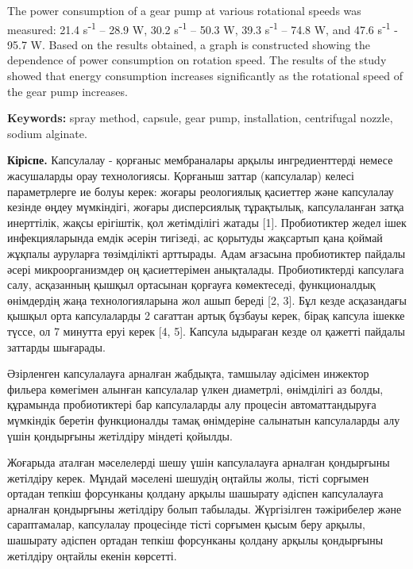 The power consumption of a gear pump at various rotational speeds was
measured: 21.4 s⁻\textsuperscript{1} -- 28.9 W, 30.2
s⁻\textsuperscript{1} -- 50.3 W, 39.3 s⁻\textsuperscript{1} -- 74.8 W,
and 47.6 s⁻\textsuperscript{1} - 95.7 W. Based on the results obtained,
a graph is constructed showing the dependence of power consumption on
rotation speed. The results of the study showed that energy consumption
increases significantly as the rotational speed of the gear pump
increases.

{\bfseries Keywords:} spray method, capsule, gear pump, installation,
centrifugal nozzle, sodium alginate.

\begin{multicols}{2}
{\bfseries Кіріспе.} Капсулалау - қорғаныс мембраналары арқылы
ингредиенттерді немесе жасушаларды орау технологиясы. Қорғаныш заттар
(капсулалар) келесі параметрлерге ие болуы керек: жоғары реологиялық
қасиеттер және капсулалау кезінде өңдеу мүмкіндігі, жоғары дисперсиялық
тұрақтылық, капсулаланған затқа инерттілік, жақсы ерігіштік, қол
жетімділігі жатады {[}1{]}. Пробиотиктер жедел ішек инфекцияларында
емдік әсерін тигізеді, ас қорытуды жақсартып қана қоймай жұқпалы
ауруларға төзімділікті арттырады. Адам ағзасына пробиотиктер пайдалы
әсері микроорганизмдер оң қасиеттерімен анықталады. Пробиотиктерді
капсулаға салу, асқазанның қышқыл ортасынан қорғауға көмектеседі,
функционалдық өнімдердің жаңа технологияларына жол ашып береді {[}2,
3{]}. Бұл кезде асқазандағы қышқыл орта капсулаларды 2 сағаттан артық
бұзбауы керек, бірақ капсула ішекке түссе, ол 7 минутта еруі керек {[}4,
5{]}. Капсула ыдыраған кезде ол қажетті пайдалы заттарды шығарады.

Әзірленген капсулалауға арналған жабдықта, тамшылау әдісімен инжектор
фильера көмегімен алынған капсулалар үлкен диаметрлі, өнімділігі аз
болды, құрамында пробиотиктері бар капсулаларды алу процесін
автоматтандыруға мүмкіндік беретін функционалды тамақ өнімдеріне
салынатын капсулаларды алу үшін қондырғыны жетілдіру міндеті қойылды.

Жоғарыда аталған мәселелерді шешу үшін капсулалауға арналған қондырғыны
жетілдіру керек. Мұндай мәселені шешудің оңтайлы жолы, тісті сорғымен
ортадан тепкіш форсунканы қолдану арқылы шашырату әдіспен капсулалауға
арналған қондырғыны жетілдіру болып табылады. Жүргізілген тәжірибелер
және сараптамалар, капсулалау процесінде тісті сорғымен қысым беру
арқылы, шашырату әдіспен ортадан тепкіш форсунканы қолдану арқылы
қондырғыны жетілдіру оңтайлы екенін көрсетті.


\end{multicols}
